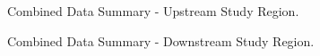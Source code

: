 \begin{figure}
	{
		\tiny{
		}
	}
	\caption[Combined Data Summary - Upstream Study Region.]{Combined Data Summary - Upstream Study Region.}
	\label{fig:mineSummaryUS}
\end{figure}

\lipsum[1]

\begin{figure}
	{
		\tiny{
		}
	}
	\caption[Combined Data Summary - Downstream Study Region.]{Combined Data Summary - Downstream Study Region.}
	\label{fig:mineSummaryUS}
\end{figure}

\lipsum[1]

\clearpage{}